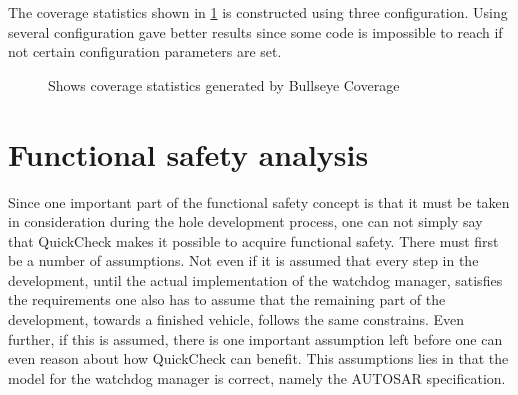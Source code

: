The coverage statistics shown in \ref{FIG:BULLSEYE} is constructed
using three configuration. Using several configuration gave better results since
some code is impossible to reach if not certain configuration parameters are set. 

\begin{figure}[!ht]
\caption{Shows coverage statistics generated by Bullseye Coverage}
\label{FIG:BULLSEYE}
\end{figure}


\section{Functional safety analysis}
Since one important part of the functional safety concept is that it must be
taken in consideration during the hole development process, one can not simply
say that QuickCheck makes it possible to acquire functional safety. There must
first be a number of assumptions. Not even if it is assumed that
every step in the development, until the actual implementation of the watchdog
manager, satisfies the requirements one also has to assume that the remaining
part of the development, towards a finished vehicle, follows the same
constrains. Even further, if this is assumed, there is one important
assumption left before
one can even reason about how QuickCheck can benefit.
This assumptions lies in that the model for the watchdog
manager is correct, namely the AUTOSAR specification.


